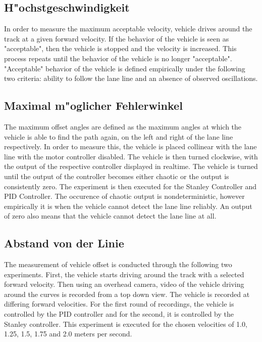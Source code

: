 \documentclass[arbeit=studie,oneside,BCOR=12mm]{ArbeitRST}
\begin{document}
\subsection{H"ochstgeschwindigkeit}

In order to measure the maximum acceptable velocity, vehicle drives around the
track at a given forward velocity. If the behavior of the vehicle is seen as
"acceptable", then the vehicle is stopped and the velocity is increased. This
process repeats until the behavior of the vehicle is no longer "acceptable".
"Acceptable" behavior of the vehicle is defined empirically under the following
two criteria: ability to follow the lane line and an absence of observed
oscillations.

\subsection{Maximal m"oglicher Fehlerwinkel}

The maximum offset angles are defined as the maximum angles at which the
vehicle is able to find the path again, on the left and right of the lane line
respectively. In order to measure this, the vehicle is placed collinear with
the lane line with the motor controller disabled. The vehicle is then turned
clockwise, with the output of the respective controller displayed in realtime.
The vehicle is turned until the output of the controller becomes either chaotic
or the output is consistently zero. The experiment is then executed for the
Stanley Controller and PID Controller. The occurence of chaotic output is
nondeterministic, however empirically it is when the vehicle cannot detect the
lane line reliably. An output of zero also means that the vehicle cannot detect
the lane line at all.

\subsection{Abstand von der Linie}

The measurement of vehicle offset is conducted through the following two
experiments. First, the vehicle starts driving around the track with a selected
forward velocity. Then using an overhead camera, video of the vehicle driving
around the curves is recorded from a top down view. The vehicle is recorded at
differing forward velocities. For the first round of recordings, the vehicle is
controlled by the PID controller and for the second, it is controlled by the
Stanley controller. This experiment is executed for the chosen velocities
of 1.0, 1.25, 1.5, 1.75 and 2.0 meters per second.
\end{document}
